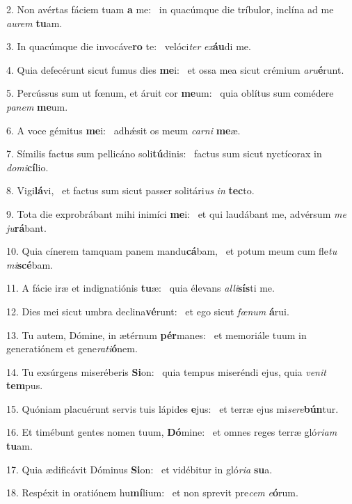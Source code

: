 2. Non avértas fáciem tuam \textbf{a} me: \ast\  in quacúmque die tríbulor, inclína ad me \textit{au}\textit{rem} \textbf{tu}am.\

3. In quacúmque die invocáve\textbf{ro} te: \ast\  velóci\textit{ter} \textit{ex}\textbf{áu}di me.\

4. Quia defecérunt sicut fumus dies \textbf{me}i: \ast\  et ossa mea sicut crémium \textit{a}\textit{ru}\textbf{é}runt.\

5. Percússus sum ut fœnum, et áruit cor \textbf{me}um: \ast\  quia oblítus sum comédere \textit{pa}\textit{nem} \textbf{me}um.\

6. A voce gémitus \textbf{me}i: \ast\  adhǽsit os meum \textit{car}\textit{ni} \textbf{me}æ.\

7. Símilis factus sum pellicáno soli\textbf{tú}dinis: \ast\  factus sum sicut nyctícorax in \textit{do}\textit{mi}\textbf{cí}lio.\

8. Vigi\textbf{lá}vi, \ast\  et factus sum sicut passer solitári\textit{us} \textit{in} \textbf{tec}to.\

9. Tota die exprobrábant mihi inimíci \textbf{me}i: \ast\  et qui laudábant me, advérsum \textit{me} \textit{ju}\textbf{rá}bant.\

10. Quia cínerem tamquam panem mandu\textbf{cá}bam, \ast\  et potum meum cum fle\textit{tu} \textit{mi}\textbf{scé}bam.\

11. A fácie iræ et indignatiónis \textbf{tu}æ: \ast\  quia élevans \textit{al}\textit{li}\textbf{sís}ti me.\

12. Dies mei sicut umbra declina\textbf{vé}runt: \ast\  et ego sicut \textit{fœ}\textit{num} \textbf{á}rui.\

13. Tu autem, Dómine, in ætérnum \textbf{pér}manes: \ast\  et memoriále tuum in generatiónem et gene\textit{ra}\textit{ti}\textbf{ó}nem.\

14. Tu exsúrgens miseréberis \textbf{Si}on: \ast\  quia tempus miseréndi ejus, quia \textit{ve}\textit{nit} \textbf{tem}pus.\

15. Quóniam placuérunt servis tuis lápides \textbf{e}jus: \ast\  et terræ ejus mi\textit{se}\textit{re}\textbf{bún}tur.\

16. Et timébunt gentes nomen tuum, \textbf{Dó}mine: \ast\  et omnes reges terræ gló\textit{ri}\textit{am} \textbf{tu}am.\

17. Quia ædificávit Dóminus \textbf{Si}on: \ast\  et vidébitur in gló\textit{ri}\textit{a} \textbf{su}a.\

18. Respéxit in oratiónem hu\textbf{mí}lium: \ast\  et non sprevit pre\textit{cem} \textit{e}\textbf{ó}rum.\

